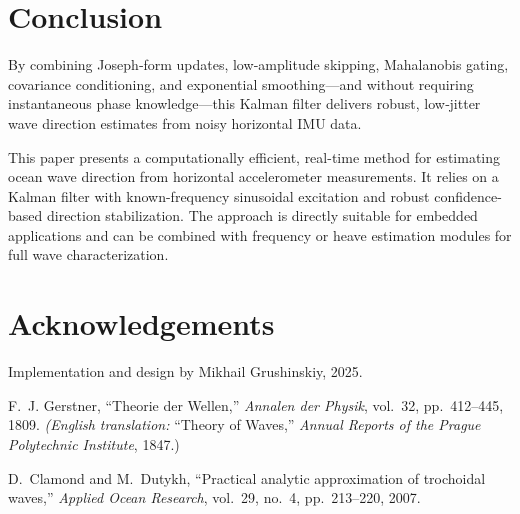 \documentclass[11pt,letterpaper]{article}
\begin{document}
\section{Conclusion}
By combining Joseph‐form updates, low‐amplitude skipping, Mahalanobis gating, covariance conditioning, and exponential smoothing—and without requiring instantaneous phase knowledge—this Kalman filter delivers robust, low‐jitter wave direction estimates from noisy horizontal IMU data.\par
\vspace{1ex}
\noindent This paper presents a computationally efficient, real-time method for estimating ocean wave direction from horizontal accelerometer measurements. It relies on a Kalman filter with known-frequency sinusoidal excitation and robust confidence-based direction stabilization. The approach is directly suitable for embedded applications and can be combined with frequency or heave estimation modules for full wave characterization.

\section*{Acknowledgements}
Implementation and design by Mikhail Grushinskiy, 2025.

\begin{thebibliography}{9}
F.~J. Gerstner, ``Theorie der Wellen,'' 
\emph{Annalen der Physik}, vol.~32, pp.~412–445, 1809.  
\emph{(English translation: }``Theory of Waves,'' \emph{Annual Reports of the Prague Polytechnic Institute}, 1847.)

D.~Clamond and M.~Dutykh, ``Practical analytic approximation of trochoidal waves,'' 
\emph{Applied Ocean Research}, vol.~29, no.~4, pp.~213–220, 2007.
\end{thebibliography}
\end{document}
